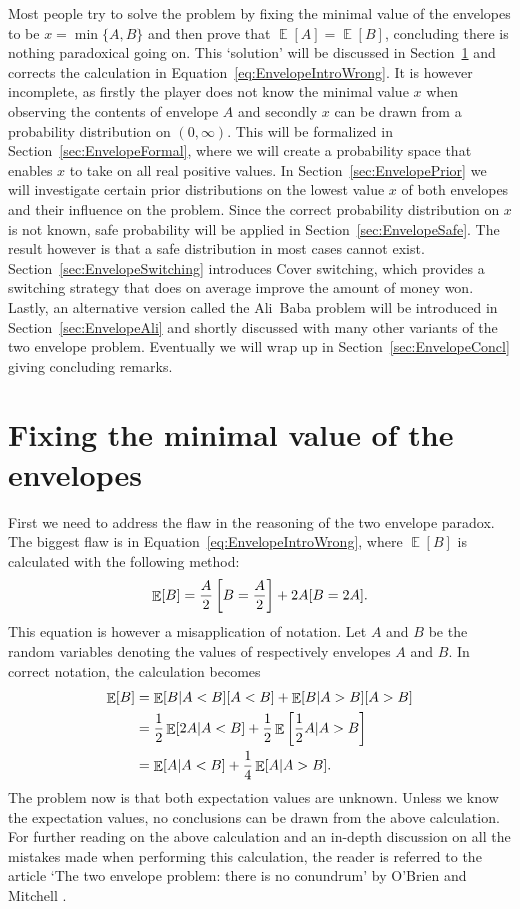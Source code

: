 \documentclass[a4paper]{report}
\theoremstyle{plain}
\theoremstyle{definition}
\theoremstyle{remark}
\numberwithin{equation}{chapter}
\let\P\relax
\DeclareMathOperator{\P}{\mathbb{P}}
\DeclareMathOperator{\E}{\mathbb{E}}
\DeclareMathOperator{\1}{\mathbbm{1}}
\begin{document}
Most people try to solve the problem by fixing the minimal value of the envelopes to be $x=\min\{A,B\}$ and then prove that $\E[A]=\E[B]$, concluding there is nothing paradoxical going on. This `solution' will be discussed in Section~\ref{sec:EnvelopeNaive} and corrects the calculation in Equation~\ref{eq:EnvelopeIntroWrong}. It is however incomplete, as firstly the player does not know the minimal value $x$ when observing the contents of envelope $A$ and secondly $x$ can be drawn from a probability distribution on $(0,\infty)$. This will be formalized in Section~\ref{sec:EnvelopeFormal}, where we will create a probability space that enables $x$ to take on all real positive values. In Section~\ref{sec:EnvelopePrior} we will investigate certain prior distributions on the lowest value $x$ of both envelopes and their influence on the problem. Since the correct probability distribution on $x$ is not known, safe probability will be applied in Section~\ref{sec:EnvelopeSafe}. The result however is that a safe distribution in most cases cannot exist. Section~\ref{sec:EnvelopeSwitching} introduces Cover switching, which provides a switching strategy that does on average improve the amount of money won. Lastly, an alternative version called the Ali~Baba problem will be introduced in Section~\ref{sec:EnvelopeAli} and shortly discussed with many other variants of the two envelope problem. Eventually we will wrap up in Section~\ref{sec:EnvelopeConcl} giving concluding remarks.

\section{Fixing the minimal value of the envelopes}\label{sec:EnvelopeNaive}
First we need to address the flaw in the reasoning of the two envelope paradox. The biggest flaw is in Equation~\ref{eq:EnvelopeIntroWrong}, where $\E[B]$ is calculated with the following method:
\begin{equation}
\E[B]=\frac{A}{2}\P\left[B=\frac{A}{2}\right]+2A\P[B=2A].
\end{equation}
This equation is however a misapplication of notation. Let $A$ and $B$ be the random variables denoting the values of respectively envelopes $A$ and $B$.  In correct notation, the calculation becomes
\begin{align}\label{eq:EnvelopeIntroCorrect}
\E[B]&=\E[B|A<B]\P[A<B]+\E[B|A>B]\P[A>B]\\
&=\frac{1}{2}\E[2A|A<B]+\frac{1}{2}\E\left[\frac{1}{2}A|A>B\right]\\
&=\E[A|A<B]+\frac{1}{4}\E[A|A>B].
\end{align}
The problem now is that both expectation values are unknown. Unless we know the expectation values, no conclusions can be drawn from the above calculation. For further reading on the above calculation and an in-depth discussion on all the mistakes made when performing this calculation, the reader is referred to the article `The two envelope problem: there is no conundrum' by O'Brien and Mitchell \cite{Brien14}. 
\end{document}
